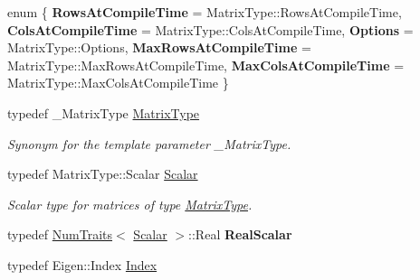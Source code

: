 \begin{DoxyCompactItemize}
\item 
\mbox{\label{class_eigen_1_1_generalized_eigen_solver_a17fa7668831542398671fa1b63818a44}} 
enum \{ \newline
{\bfseries Rows\+At\+Compile\+Time} = Matrix\+Type\+::Rows\+At\+Compile\+Time, 
{\bfseries Cols\+At\+Compile\+Time} = Matrix\+Type\+::Cols\+At\+Compile\+Time, 
{\bfseries Options} = Matrix\+Type\+::Options, 
{\bfseries Max\+Rows\+At\+Compile\+Time} = Matrix\+Type\+::Max\+Rows\+At\+Compile\+Time, 
\newline
{\bfseries Max\+Cols\+At\+Compile\+Time} = Matrix\+Type\+::Max\+Cols\+At\+Compile\+Time
 \}
\item 
\mbox{\label{class_eigen_1_1_generalized_eigen_solver_a56f4b9823bb9a267de3aaf48428cd247}} 
typedef \+\_\+\+Matrix\+Type \mbox{\hyperlink{class_eigen_1_1_generalized_eigen_solver_a56f4b9823bb9a267de3aaf48428cd247}{Matrix\+Type}}
\begin{DoxyCompactList}\small\item\em Synonym for the template parameter {\ttfamily \+\_\+\+Matrix\+Type}. \end{DoxyCompactList}\item 
\mbox{\label{class_eigen_1_1_generalized_eigen_solver_afb318d0b097ff8dd5a7410d31317ca47}} 
typedef Matrix\+Type\+::\+Scalar \mbox{\hyperlink{class_eigen_1_1_generalized_eigen_solver_afb318d0b097ff8dd5a7410d31317ca47}{Scalar}}
\begin{DoxyCompactList}\small\item\em Scalar type for matrices of type \mbox{\hyperlink{class_eigen_1_1_generalized_eigen_solver_a56f4b9823bb9a267de3aaf48428cd247}{Matrix\+Type}}. \end{DoxyCompactList}\item 
\mbox{\label{class_eigen_1_1_generalized_eigen_solver_a2fb7acd2ce5c1e73025a1d2d4bb27107}} 
typedef \mbox{\hyperlink{struct_eigen_1_1_num_traits}{Num\+Traits}}$<$ \mbox{\hyperlink{class_eigen_1_1_generalized_eigen_solver_afb318d0b097ff8dd5a7410d31317ca47}{Scalar}} $>$\+::Real {\bfseries Real\+Scalar}
\item 
typedef Eigen\+::\+Index \mbox{\hyperlink{class_eigen_1_1_generalized_eigen_solver_a46a0ff3841059479ec314e56a5645302}{Index}}

\end{DoxyCompactItemize}
